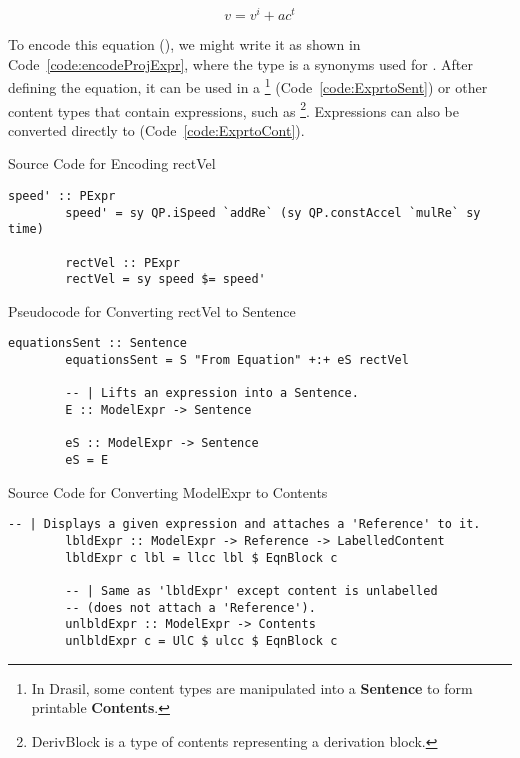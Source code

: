 \begin{equation}
	\label{eq:velocity}
	v=v^i+ac^t
\end{equation}

To encode this equation (), we might write it as shown in 
Code~\ref{code:encodeProjExpr}, where the type  is a synonyms 
used for . After defining the equation, it can be used 
in a  \footnote{In Drasil, some content types are 
manipulated into a \textbf{Sentence} to form printable \textbf{Contents}.} 
(Code~\ref{code:ExprtoSent}) or other content types that contain expressions, 
such as \footnote{DerivBlock is a type of contents 
representing a derivation block.}. Expressions can also be converted directly 
to  (Code~\ref{code:ExprtoCont}).

\begin{listing}[h]
	\caption{Source Code for Encoding rectVel}
	\label{code:encodeProjExpr}
	\begin{lstlisting}[language=haskell1]
		speed' :: PExpr
		speed' = sy QP.iSpeed `addRe` (sy QP.constAccel `mulRe` sy time)
		
		rectVel :: PExpr
		rectVel = sy speed $= speed'
	\end{lstlisting}
\end{listing}

\begin{listing}[h]
	\caption{Pseudocode for Converting rectVel to Sentence}
	\label{code:ExprtoSent}
	\begin{lstlisting}[language=haskell1]
		equationsSent :: Sentence
		equationsSent = S "From Equation" +:+ eS rectVel
		
		-- | Lifts an expression into a Sentence.
		E :: ModelExpr -> Sentence
		
		eS :: ModelExpr -> Sentence
		eS = E
	\end{lstlisting}
\end{listing}

\begin{listing}[h]
	\caption{Source Code for Converting ModelExpr to Contents}
	\label{code:ExprtoCont}
	\begin{lstlisting}[language=haskell1]
		-- | Displays a given expression and attaches a 'Reference' to it.
		lbldExpr :: ModelExpr -> Reference -> LabelledContent
		lbldExpr c lbl = llcc lbl $ EqnBlock c
		
		-- | Same as 'lbldExpr' except content is unlabelled 
		-- (does not attach a 'Reference').
		unlbldExpr :: ModelExpr -> Contents
		unlbldExpr c = UlC $ ulcc $ EqnBlock c
	\end{lstlisting}
\end{listing}

